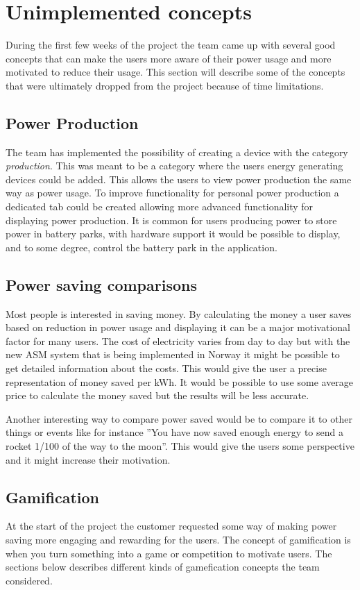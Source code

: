 \section{Unimplemented concepts}
During the first few weeks of the project the team came up with several good concepts that can make the users more aware of their power usage and more motivated to reduce their usage. This section will describe some of the concepts that were ultimately dropped from the project because of time limitations.

\subsection{Power Production}
The team has implemented the possibility of creating a device with the category \emph{production}. This was meant to be a category where the users energy generating devices could be added. This allows the users to view power production the same way as power usage. To improve functionality for personal power production a dedicated tab could be created allowing more advanced functionality for displaying power production.
It is common for users producing power to store power in battery parks, with hardware support it would be possible to display, and to some degree, control the battery park in the application.

\subsection{Power saving comparisons}
\label{sec:psc}
Most people is interested in saving money. By calculating the money a user saves based on reduction in power usage and displaying it can be a major motivational factor for many users. The cost of electricity varies from day to day but with the new ASM\cite{asm} system that is being implemented in Norway it might be possible to get detailed information about the costs. This would give the user a precise representation of money saved per kWh. It would be possible to use some average price to calculate the money saved but the results will be less accurate.

Another interesting way to compare power saved would be to compare it to other things or events like for instance ''You have now saved enough energy to send a rocket 1/100 of the way to the moon''. This would give the users some perspective and it might increase their motivation.

\subsection{Gamification}
At the start of the project the customer requested some way of making power saving more engaging and rewarding for the users. The concept of gamification is when you turn something into a game or competition to motivate users. The sections below describes different kinds of gamefication concepts the team considered.

